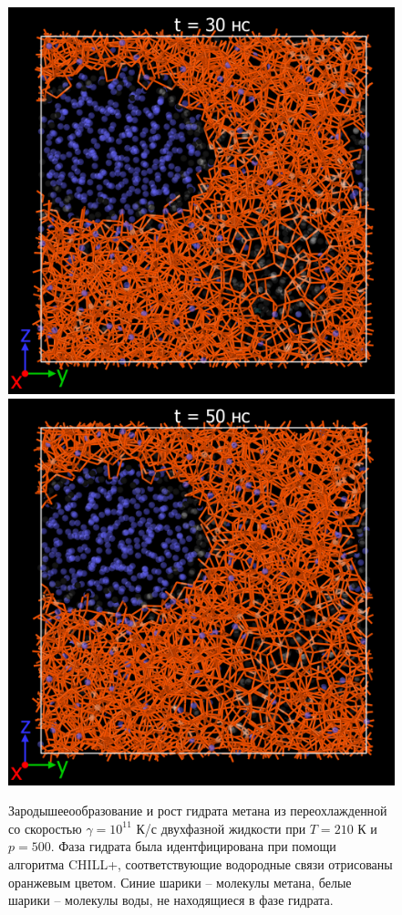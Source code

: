 \begin{figure}[H]
\begin{minipage}{\linewidth}
    \end{minipage}\vfill
    \begin{minipage}{\linewidth}
        \centering
        \includegraphics[width=.4\linewidth]{figures/nuclei5.png}
        \includegraphics[width=.4\linewidth]{figures/nuclei6.png}
    \end{minipage}
    \caption{Зародышееообразование и рост гидрата метана из переохлажденной со скоростью $\gamma=10^{11}$ К/с двухфазной жидкости при $T=210$ К и $p=500$. Фаза гидрата была идентфицирована при помощи алгоритма CHILL+, соответствующие водородные связи отрисованы оранжевым цветом. Синие шарики -- молекулы метана, белые шарики -- молекулы воды, не находящиеся в фазе гидрата.}
    \label{fig3.5}
\end{figure}

